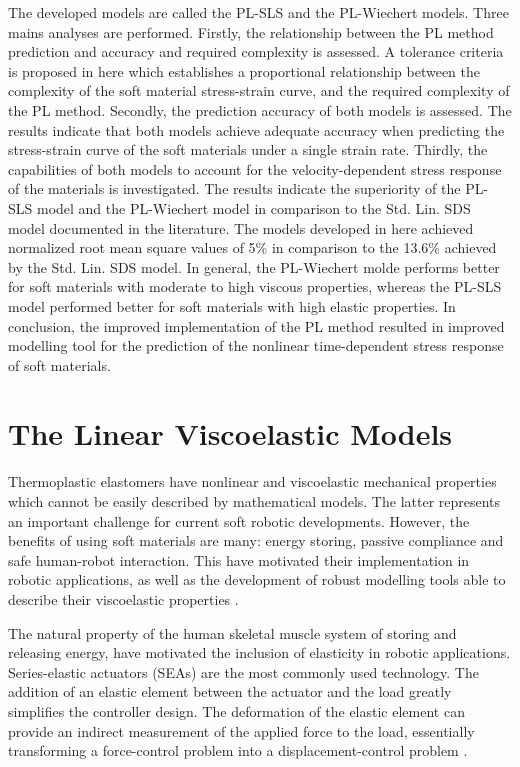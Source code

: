 The developed models are called the PL-SLS and the PL-Wiechert models. Three mains analyses are performed. Firstly, the relationship between the PL method prediction and accuracy and required complexity is assessed. A tolerance criteria is proposed in here which establishes a proportional relationship between the complexity of the soft material stress-strain curve, and the required complexity of the PL method. Secondly, the prediction accuracy of both models is assessed. The results indicate that both models achieve adequate accuracy when predicting the stress-strain curve of the soft materials under a single strain rate. Thirdly, the capabilities of both models to account for the velocity-dependent stress response of the materials is investigated. The results indicate the superiority of the PL-SLS model and the PL-Wiechert model in comparison to the Std. Lin. SDS model documented in the literature. The models developed in here achieved normalized root mean square values of 5\% in comparison to the 13.6\% achieved by the Std. Lin. SDS model. In general, the PL-Wiechert molde performs better for soft materials with moderate to high viscous properties, whereas the PL-SLS model performed better for soft materials with high elastic properties. In conclusion, the improved implementation of the PL method resulted in improved modelling tool for the prediction of the nonlinear time-dependent stress response of soft materials.

\section{The Linear Viscoelastic Models}

Thermoplastic elastomers have nonlinear and viscoelastic mechanical properties which cannot be easily described by mathematical models. The latter represents an important challenge for current soft robotic developments. However, the benefits of using soft materials are many: energy storing, passive compliance and safe human-robot interaction. This have motivated their implementation in robotic applications, as well as the development of robust modelling tools able to describe their viscoelastic properties \cite{lee2017soft}.

The natural property of the human skeletal muscle system of storing and releasing energy, have motivated the inclusion of elasticity in robotic applications. Series-elastic actuators (SEAs) are the most commonly used technology. The addition of an elastic element between the actuator and the load greatly simplifies the controller design. The deformation of the elastic element can provide an indirect measurement of the applied force to the load, essentially transforming a force-control problem into a displacement-control problem \cite{agarwal2017series}. 

